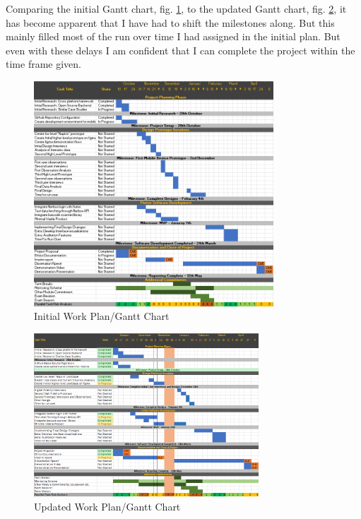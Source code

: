 \documentclass [11pt,a4paper]{article}
\begin{document}
Comparing the initial Gantt chart, fig. \ref{fig:initialworkplan}, to the updated Gantt chart, fig. \ref{fig:updatedworkplan}, it has become apparent that I have had to shift the milestones along. But this mainly filled most of the run over time I had assigned in the initial plan. But even with these delays I am confident that I can complete the project within the time frame given.
\begin{figure}[ht]
    \centering
    \includegraphics[width=0.8\textwidth]{images/keeptrack-gantt-initial.png}
    \caption{Initial Work Plan/Gantt Chart}
    \label{fig:initialworkplan}
\end{figure}

\begin{figure}[ht]
    \centering
    \includegraphics[width=0.75\textwidth]{images/keeptrack-gantt-interim.png}
    \caption{Updated Work Plan/Gantt Chart}
    \label{fig:updatedworkplan}
\end{figure}
\end{document}
